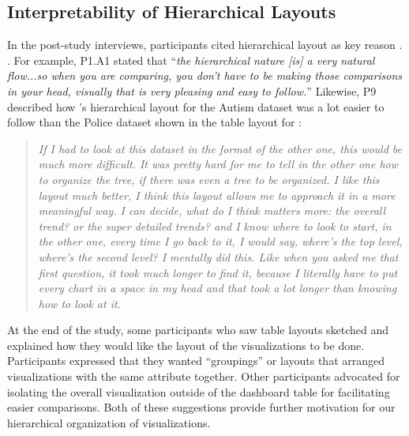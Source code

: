 \subsection{Interpretability of Hierarchical Layouts}
\par In the post-study interviews, participants cited hierarchical layout as  key reason . . For example, P1.A1 stated that ``\textit{the hierarchical nature [is] a very natural flow...so when you are comparing, you don't have to be making those comparisons in your head, visually that is very pleasing and easy to follow.}'' %
Likewise, P9 described how \system's hierarchical layout for the Autism dataset was a lot easier to follow than the Police dataset shown in the table layout for \cluster:
\begin{quote}
\textit{If I had to look at this dataset in the format of the other one, this would be much more difficult. It was pretty hard for me to tell in the other one how to organize the tree, if there was even a tree to be organized. I like this layout much better, I think this layout allows me to approach it in a more meaningful way. I can decide, what do I think matters more: the overall trend? or the super detailed trends? and I know where to look to start, in the other one, every time I go back to it, I would say, where's the top level, where's the second level? I mentally did this. Like when you asked me that first question, it took much longer to find it, because I literally have to put every chart in a space in my head and that took a lot longer than knowing how to look at it.}
\end{quote}
At the end of the study, some participants who saw table layouts sketched and explained how they would like the layout of the visualizations to be done. Participants expressed that they wanted ``groupings'' or layouts that arranged visualizations with the same attribute together. Other participants advocated for isolating the overall visualization outside of the dashboard table for facilitating easier comparisons. Both of these suggestions provide further motivation for our hierarchical organization of visualizations. 
